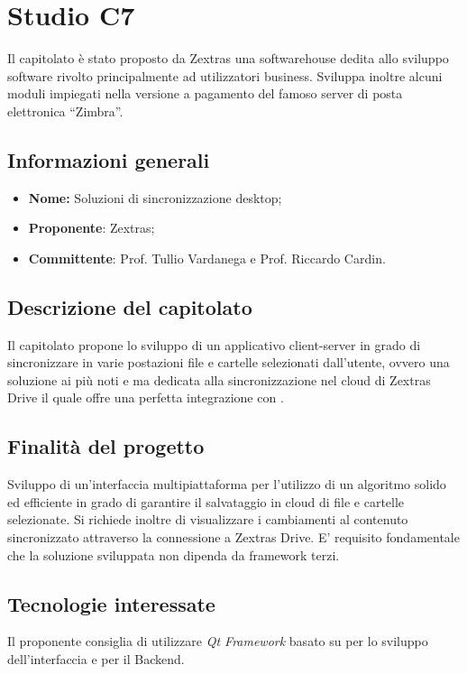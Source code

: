 \section{Studio C7} \label{_c7}

Il capitolato è stato proposto da Zextras una softwarehouse dedita allo sviluppo software rivolto principalmente ad utilizzatori business.
Sviluppa inoltre alcuni moduli impiegati nella versione a pagamento del famoso server di posta elettronica “Zimbra”.

\subsection{Informazioni generali}
\begin{itemize}
	\item \textbf{Nome:} Soluzioni di sincronizzazione desktop;
	\item \textbf{Proponente}: Zextras;
	\item \textbf{Committente}: Prof. Tullio Vardanega e Prof. Riccardo Cardin.
\end{itemize}

\subsection{Descrizione del capitolato}
Il capitolato propone lo sviluppo di un applicativo client-server in grado di sincronizzare in varie postazioni file e cartelle selezionati dall’utente, ovvero una soluzione ai più noti \textit{} e \textit{} ma dedicata alla sincronizzazione nel cloud di Zextras Drive il quale offre una perfetta integrazione con \textit{}.

\subsection{Finalità del progetto}
Sviluppo di un’interfaccia multipiattaforma per l’utilizzo di un algoritmo solido ed efficiente in grado di garantire il salvataggio in cloud di file e cartelle selezionate.
Si richiede inoltre di visualizzare i cambiamenti al contenuto sincronizzato attraverso la connessione a Zextras Drive. E’ requisito fondamentale che la soluzione sviluppata non dipenda da framework terzi.


\subsection{Tecnologie interessate}
Il proponente consiglia di utilizzare \textit{Qt Framework} basato su  per lo sviluppo dell’interfaccia e \textit{} per il Backend.

